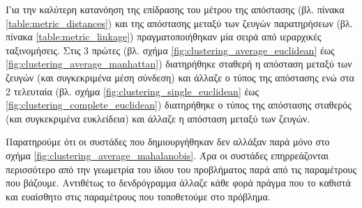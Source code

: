 \documentclass{assignment}
\begin{document}
Για την καλύτερη κατανόηση της επίδρασης του μέτρου της απόστασης (βλ. πίνακα \ref{table:metric_distances}) και της απόστασης μεταξύ των ζευγών παρατηρήσεων (βλ. πίνακα \ref{table:metric_linkage}) πραγματοποιήθηκαν μία σειρά από ιεραρχικές ταξινομήσεις. Στις 3 πρώτες (βλ. σχήμα \ref{fig:clustering_average_euclidean} έως \ref{fig:clustering_average_manhattan}) διατηρήθηκε σταθερή η απόσταση μεταξύ των ζευγών (και συγκεκριμένα μέση σύνδεση) και άλλαζε ο τύπος της απόστασης ενώ στα 2 τελευταία (βλ. σχήμα \ref{fig:clustering_single_euclidean} έως \ref{fig:clustering_complete_euclidean}) διατηρήθηκε ο τύπος της απόστασης σταθερός (και συγκεκριμένα ευκλείδεια) και άλλαζε η απόσταση μεταξύ των ζευγών.

Παρατηρούμε ότι οι συστάδες που δημιουργήθηκαν δεν αλλάξαν παρά μόνο στο σχήμα \ref{fig:clustering_average_mahalanobis}. Άρα οι συστάδες επηρρεάζονται περισσότερο από την γεωμετρία του ίδιου του προβλήματος παρά από τις παραμέτρους που βάζουμε. Αντιθέτως το δενδρόγραμμα άλλαζε κάθε φορά πράγμα που το καθιστά και ευαίσθητο στις παραμέτρους που τοποθετούμε στο πρόβλημα.
\end{document}
